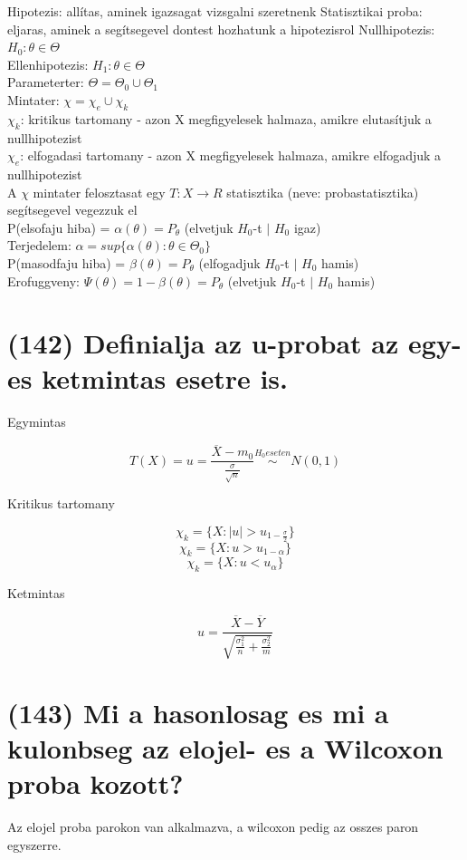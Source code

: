 \documentclass[12p]{article}
\begin{document}
Hipotezis: allítas, aminek igazsagat vizsgalni szeretnenk
Statisztikai proba: eljaras, aminek a segítsegevel dontest hozhatunk a hipotezisrol
Nullhipotezis: $H_0 : \theta \in \Theta$\\
Ellenhipotezis: $H_1 : \theta \in \Theta$\\
Parameterter: $\Theta = \Theta_0 \cup \Theta_1$\\
Mintater: $\chi = \chi_e \cup \chi_k$\\
$\chi_k$: kritikus tartomany - azon X megfigyelesek halmaza, amikre elutasítjuk a nullhipotezist\\
$\chi_e$: elfogadasi tartomany - azon X megfigyelesek halmaza, amikre elfogadjuk a nullhipotezist\\
A $\chi$ mintater felosztasat egy $T : X \rightarrow R$ statisztika (neve: probastatisztika) segítsegevel vegezzuk el\\
P(elsofaju hiba) = $\alpha(\theta) = P_\theta$ (elvetjuk $H_0$-t $|$ $H_0$ igaz)\\
Terjedelem: $\alpha = sup\{\alpha(\theta) : \theta \in \Theta_0\}$\\
P(masodfaju hiba) = $\beta(\theta) = P_\theta$ (elfogadjuk $H_0$-t $|$ $H_0$ hamis)\\
Erofuggveny: $\Psi(\theta) = 1 - \beta(\theta) = P_\theta$ (elvetjuk $H_0$-t $|$ $H_0$ hamis)

\section{(142)  Definialja az u-probat az egy- es ketmintas esetre is.}

Egymintas

$$T(X) = u = \frac{\overline{X} - m_0}{\frac{\sigma}{\sqrt{n}}} \stackrel{H_0 eseten}{\sim} N(0, 1)$$

Kritikus tartomany

$$\chi_k = \{X: |u| > u_{1-\frac{\sigma}{2}}\}$$
$$\chi_k = \{X: u > u_{1-\alpha}\}$$
$$\chi_k = \{X: u < u_\alpha\}$$

Ketmintas

$$\displaystyle{u = \frac{\overline{X} - \overline{Y}}{\sqrt{\frac{\sigma_1^2}{n} + \frac{\sigma_2^2}{m}}}}$$

\section{(143) Mi a hasonlosag es mi a kulonbseg az elojel- es a Wilcoxon proba kozott?}

Az elojel proba parokon van alkalmazva, a wilcoxon pedig az osszes paron egyszerre.
\end{document}
